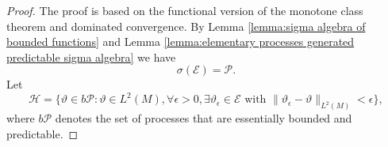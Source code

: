 \documentclass[11pt,a4paper,twoside,openany]{report}
\numberwithin{equation}{section}
\theoremstyle{plain} %
\theoremstyle{definition} %
\theoremstyle{remark} %
\begin{document}
\begin{proof}
    The proof is based on the functional version of the monotone class theorem and dominated convergence. By Lemma \ref{lemma:sigma algebra of bounded functions} and Lemma \ref{lemma:elementary processes generated predictable sigma algebra} we have 
    \begin{equation*}
        \sigma(\mathcal{E})=\mathcal{P}.
    \end{equation*}
    Let 
    \begin{equation*}
        \mathcal{H}=\{ \vartheta\in b\mathcal{P}:\vartheta\in L^2(M),\forall \epsilon>0, \exists \vartheta_{\epsilon}\in \mathcal{E}\text{ with }\lVert \vartheta_{\epsilon}-\vartheta\rVert_{L^2(M)}<\epsilon\},
    \end{equation*}
    where \(b\mathcal{P}\) denotes the set of processes that are essentially bounded and predictable.


\end{proof}
\end{document}
